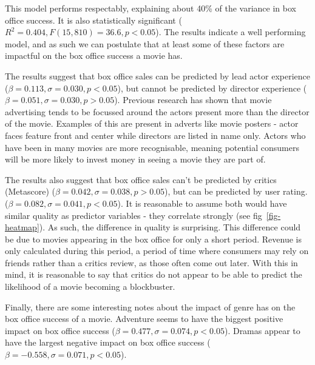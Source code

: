         \begin{multicols}{2}
            This model performs respectably, explaining about 40\% of the variance in box
                office success.
            It is also statistically significant ($R^2=0.404, F(15,810)=36.6, p<0.05$).
            The results indicate a well performing model, and as such we can postulate that
                at least some of these factors are impactful on the box office success a movie
                has.

            The results suggest that box office sales can be predicted by lead actor
                experience ($\beta=0.113, \sigma=0.030, p<0.05$), but cannot be predicted by
                director experience ($\beta=0.051, \sigma=0.030, p>0.05$).
            Previous research has shown that movie advertising tends to be focussed around
                the actors present more than the director of the movie\cite{elberse2007power}.
            Examples of this are present in adverts like movie posters - actor faces
                feature front and center while directors are listed in name only.
            Actors who have been in many movies are more recognisable, meaning potential
                consumers will be more likely to invest money in seeing a movie they are part
                of.

            The results also suggest that box office sales can't be predicted by critics
                (Metascore) ($\beta=0.042, \sigma=0.038, p>0.05$), but can be predicted by user
                rating.
            ($\beta=0.082, \sigma=0.041, p<0.05$).
            It is reasonable to assume both would have similar quality as predictor
                variables - they correlate strongly (see fig~\ref{fig-heatmap}).
            As such, the difference in quality is surprising.
            This difference could be due to movies appearing in the box office for only a
                short period.
            Revenue is only calculated during this period, a period of time where consumers
                may rely on friends rather than a critics review, as those often come out
                later.
            With this in mind, it is reasonable to say that critics do not appear to be
                able to predict the likelihood of a movie becoming a blockbuster.

            Finally, there are some interesting notes about the impact of genre has on the
                box office success of a movie.
            Adventure seems to have the biggest positive impact on box office success
                ($\beta=0.477,\sigma=0.074,p<0.05$).
            Dramas appear to have the largest negative impact on box office success
                ($\beta=-0.558,\sigma=0.071,p<0.05$).
        \end{multicols}

